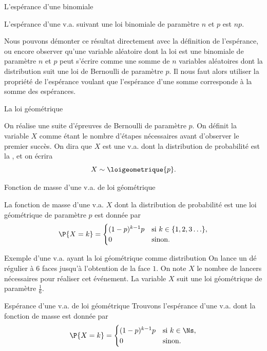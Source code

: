 \documentclass[nuit,charter,pied]{BeamerJS}
\begin{document}
\begin{frame}[t]{L'espérance d'une binomiale}
	\begin{thm}{}
		L'espérance d'une v.a. suivant une loi binomiale de paramètre $n$ et $p$ est $np$.
	\end{thm}\pause
	\begin{rem}{} Nous pouvons démonter ce résultat directement avec la définition de l'espérance, ou encore observer qu'une variable aléatoire dont la loi est une binomiale de paramètre $n$ et $p$ peut s'écrire comme une somme de $n$ variables aléatoires dont la distribution suit une loi de Bernoulli de paramètre $p$. Il nous faut alors utiliser la propriété de l'espérance voulant que l'espérance d'une somme corresponde à la somme des espérances.
	\end{rem}
\end{frame}
\begin{frame}{La loi géométrique}
	
	\begin{defn}
		On réalise une suite d'épreuves de Bernoulli de paramètre $p$. On définit la variable $X$ comme étant le nombre d'étapes nécessaires avant d'observer le premier succès. On dira que $X$ est une v.a. dont la distribution de probabilité est la , et on écrira
		\[X\sim \loigeometrique{p}.\]
	\end{defn}
	\end{frame}
	\begin{frame}{Fonction de masse d'une v.a. de loi géométrique}
	\begin{prop}
		La fonction de masse d'une v.a. $X$ dont la distribution de probabilité est une loi géométrique de paramètre $p$ est donnée par
		\[
		\P{X=k}=\begin{cases} (1-p)^{k-1}p &\text{si}~k\in\{1,2,3\ldots\},\\
			0 & \text{sinon}
			.\end{cases}
		\]
	\end{prop}
\end{frame}
\begin{frame}[t]{Exemple d'une v.a. ayant la loi géométrique comme distribution}
	On lance un dé régulier à $6$ faces jusqu'à l'obtention de la face $1$. On note $X$ le nombre de lancers nécessaires pour réaliser cet événement. La variable $X$ suit une loi géométrique de paramètre $\frac{1}{6}$.
\end{frame}
\begin{frame}[t]{Espérance d'une v.a. de loi géométrique}
Trouvons l'espérance d'une v.a. dont la fonction de masse est donnée par
	\[
	\P{X=k}=\begin{cases} (1-p)^{k-1}p &\text{si}~k\in\Ns,\\
		0 & \text{sinon}
		.\end{cases}
	\]
\end{frame}
\end{document}
